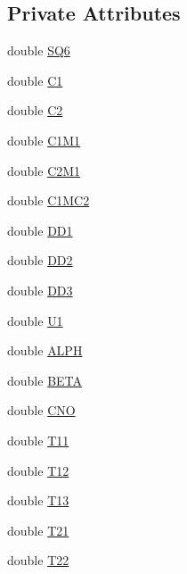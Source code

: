 \subsection*{Private Attributes}
\begin{DoxyCompactItemize}
\item 
double \hyperlink{classodes_1_1Radau5cc_ab72c18864827bc09b414a8c01e956698}{S\+Q6}
\item 
double \hyperlink{classodes_1_1Radau5cc_ad1df67bebb6c9753e789643dbbac4b64}{C1}
\item 
double \hyperlink{classodes_1_1Radau5cc_a4c4e52ad2bb85b6e3a598b75aecbdad8}{C2}
\item 
double \hyperlink{classodes_1_1Radau5cc_a1cf578a3f19e8e43321e182c46f710f4}{C1\+M1}
\item 
double \hyperlink{classodes_1_1Radau5cc_ab2b14b1062b5fb6dde7557fbac202c29}{C2\+M1}
\item 
double \hyperlink{classodes_1_1Radau5cc_a9d7ed1a3ffb2f3c582e1790e65f24671}{C1\+M\+C2}
\item 
double \hyperlink{classodes_1_1Radau5cc_a9a211ff738351641da6cdd159917fef2}{D\+D1}
\item 
double \hyperlink{classodes_1_1Radau5cc_a86933b385c18f7ff7072da61f03daf05}{D\+D2}
\item 
double \hyperlink{classodes_1_1Radau5cc_a1c94a1f803b67e35bbed88d6152d1fff}{D\+D3}
\item 
double \hyperlink{classodes_1_1Radau5cc_ae23acdd71ce8640aa40e111b4df06922}{U1}
\item 
double \hyperlink{classodes_1_1Radau5cc_a42e13c53f1b12eee97f358a2913f8e4f}{A\+L\+P\+H}
\item 
double \hyperlink{classodes_1_1Radau5cc_aca32380625f370758068d4c225958cd1}{B\+E\+T\+A}
\item 
double \hyperlink{classodes_1_1Radau5cc_aaa49f4e7f5289a7012e2ce29d2a7dab8}{C\+N\+O}
\item 
double \hyperlink{classodes_1_1Radau5cc_a3538e815c4a1a4449692ef7cf5331fcc}{T11}
\item 
double \hyperlink{classodes_1_1Radau5cc_ac47257f4b685d8016d8bdc0aaf6c3861}{T12}
\item 
double \hyperlink{classodes_1_1Radau5cc_a49b429abb614b8d4f41e6df611a12c06}{T13}
\item 
double \hyperlink{classodes_1_1Radau5cc_a5933359813b622b1dd1f67605df31521}{T21}
\item 
double \hyperlink{classodes_1_1Radau5cc_a1c4adb6f7b47032fe75bd53884a37ef3}{T22}
\item 

\end{DoxyCompactItemize}
